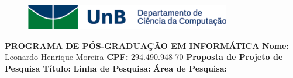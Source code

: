 \documentclass[a4paper,12pt]{article}
\begin{document}
\newcommand{\linhaDupla}{\newline \newline}


\begin{figure}
 \includegraphics[width=0.8\textwidth]{images/logoUnB.png}
\end{figure}

\textbf{PROGRAMA DE PÓS-GRADUAÇÃO EM INFORMÁTICA}
\linhaDupla
\textbf{Nome:} Leonardo Henrique Moreira
\linhaDupla
\textbf{CPF:} 294.490.948-70
\linhaDupla
\textbf{Proposta de Projeto de Pesquisa}
\linhaDupla
\textbf{Título:}
\linhaDupla
\textbf{Linha de Pesquisa:}
\linhaDupla
\indent\textbf{Área de Pesquisa:}

\newpage
\end{document}
